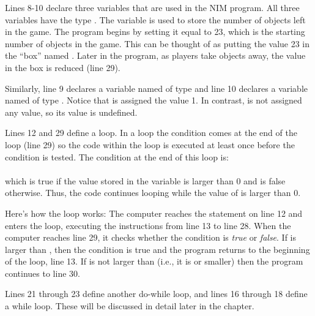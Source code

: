 
Lines 8-10 declare three variables that are used in the NIM program.  All three variables have the type .  
The variable  is used to store the number of objects left in the game.  The program begins by setting it equal to 23, which is the starting number of objects in the game.  This can be thought of as putting the value 23 in the ``box'' named .  Later in the program, as players take objects away, the value in the box  is reduced (line 29).  

Similarly, line 9 declares a variable named  of type  and line 10 declares a variable named   of type .  Notice that  is assigned the value 1.  In contrast,  is not assigned any value, so its value is undefined.


Lines 12 and 29 define a  loop.  In a  loop the condition comes at the end of the loop (line 29) so the code within the loop is executed at least once before the condition is tested.
The condition at the end of this loop is:\\
\\
which is true if the value stored in the variable  is larger than 0 and is false otherwise.  Thus, the code continues looping while the value of  is larger than 0.

Here's how the loop works: The computer reaches the  statement on line 12 and enters the loop, executing the instructions from line 13 to line 28.  When the computer reaches line 29, it checks whether the condition  is \emph{true} or \emph{false}.   If  is larger than , then the condition is true and the program returns to the beginning of the loop, line 13.  If  is not larger than  (i.e., it is  or smaller) then the program continues to line 30.

Lines 21 through 23 define another do-while loop, and lines 16 through 18 define a while loop.  These will be discussed in detail later in the chapter.

